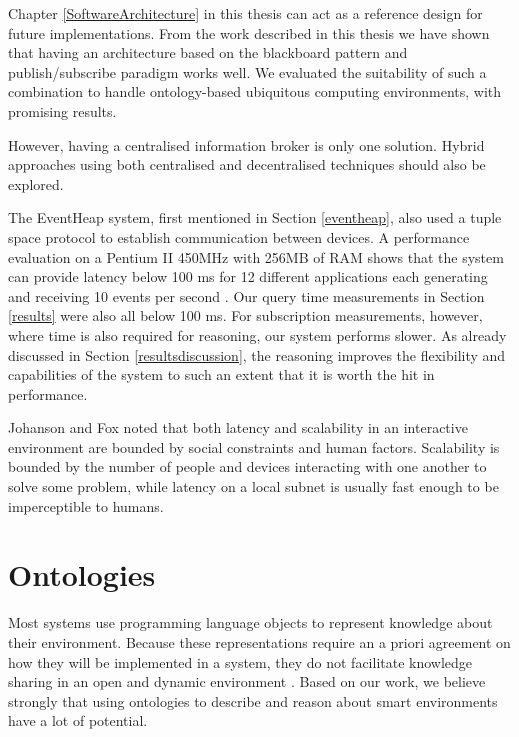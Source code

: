 Chapter \ref{SoftwareArchitecture} in this thesis can act as a reference design for future implementations. From the work described in this thesis we have shown that having an architecture based on the blackboard pattern and publish/subscribe paradigm works well. We evaluated the suitability of such a combination to handle on\-tol\-o\-gy-based ubiquitous computing environments, with promising results.%

However, having a centralised information broker is only one solution. Hybrid approaches using both centralised and decentralised techniques should also be explored.   

The EventHeap system, first mentioned in Section \ref{eventheap}, also used a tuple space protocol to establish communication between devices. A performance evaluation on a Pentium II 450MHz with 256MB of RAM shows that the system can provide latency below 100 ms for 12 different applications each generating and receiving 10 events per second \cite{Johanson2002}. Our query time measurements in Section \ref{results} were also all below 100 ms. For subscription measurements, however, where time is also required for reasoning, our system performs slower. As already discussed in Section \ref{resultsdiscussion}, the reasoning improves the flexibility and capabilities of the system to such an extent that it is worth the hit in performance.

Johanson and Fox \cite{Johanson2002} noted that both latency and scalability in an interactive environment are bounded by social constraints and human factors. Scalability is bounded by the number of people and devices interacting with one another to solve some problem, while latency on a local subnet is usually fast enough to be imperceptible to humans.





\section{Ontologies}

Most systems use programming language objects to represent knowledge about their environment. Because these representations require an a priori agreement on how they will be implemented in a system, they do not facilitate knowledge sharing in an open and dynamic environment \cite{Chen2004}. Based on our work, we believe strongly that using ontologies to describe and reason about smart environments have a lot of potential.  
	

